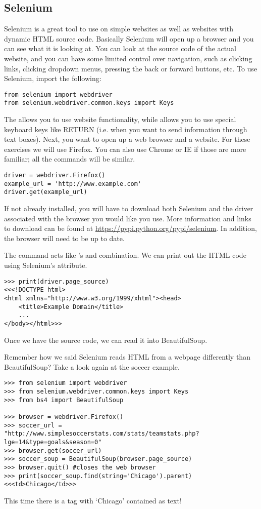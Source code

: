\subsection*{Selenium}

Selenium is a great tool to use on simple websites as well as websites with dynamic HTML source code.
Basically Selenium will open up a browser and you can see what it is looking at.
You can look at the source code of the actual website, and you can have some limited control over navigation, such as clicking links, clicking dropdown menus, pressing the back or forward buttons, etc.
To use Selenium, import the following:
\begin{lstlisting}
from selenium import webdriver
from selenium.webdriver.common.keys import Keys
\end{lstlisting}
The  allows you to use website functionality, while  allows you to use special keyboard keys like RETURN (i.e. when you want to send information through text boxes).
Next, you want to open up a web browser and a website.
For these exercises we will use Firefox.
You can also use Chrome or IE if those are more familiar; all the commands will be similar.

\begin{lstlisting}
driver = webdriver.Firefox()
example_url = 'http://www.example.com'
driver.get(example_url)
\end{lstlisting}

\begin{info}
If not already installed, you will have to download both Selenium and the driver associated with the browser you would like you use. More information and links to download can be found at \url{https://pypi.python.org/pypi/selenium}. In addition, the browser will need to be up to date.
\end{info}

The  command acts like 's  and  combination.
We can print out the HTML code using Selenium's  attribute.
\begin{lstlisting}
>>> print(driver.page_source)
<<<!DOCTYPE html>
<html xmlns="http://www.w3.org/1999/xhtml"><head>
    <title>Example Domain</title>
    ...
</body></html>>>
\end{lstlisting}
Once we have the source code, we can read it into BeautifulSoup.

Remember how we said Selenium reads HTML from a webpage differently than BeautifulSoup?
Take a look again at the soccer example.
\begin{lstlisting}
>>> from selenium import webdriver
>>> from selenium.webdriver.common.keys import Keys
>>> from bs4 import BeautifulSoup

>>> browser = webdriver.Firefox()
>>> soccer_url = "http://www.simplesoccerstats.com/stats/teamstats.php?lge=14&type=goals&season=0"
>>> browser.get(soccer_url)
>>> soccer_soup = BeautifulSoup(browser.page_source)
>>> browser.quit() #closes the web browser
>>> print(soccer_soup.find(string='Chicago').parent)
<<<td>Chicago</td>>>
\end{lstlisting}
This time there is a tag with `Chicago' contained as text!

